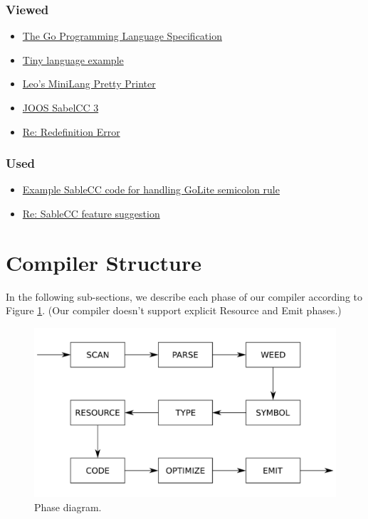 \documentclass{article}
\begin{document}
\subsubsection{Viewed}
\begin{itemize}
\item \href{https://golang.org/ref/spec}{The Go Programming Language Specification}
\item \href{http://www.sable.mcgill.ca/~hendren/520/2016/tiny/}{Tiny language example}
\item \href{https://github.com/leo-teng-long/minipart2/blob/master/src/mini/PrettyPrinter.java}{Leo's MiniLang Pretty Printer}
\item \href{http://www.sable.mcgill.ca/~hendren/520/2016/joos/jjoos-scc-3/}{JOOS SabelCC 3}
\item \href{http://www.sable.mcgill.ca/listarchives/sablecc-list/msg00639.html}{Re: Redefinition Error}
\end{itemize}

\subsubsection{Used}
\begin{itemize}
\item \href{http://www.sable.mcgill.ca/~hendren/520/2016/semicolon-test/}{Example SableCC code for handling GoLite semicolon rule}
\item \href{http://lists.sablecc.org/pipermail/sablecc-discussion/msg00144.html}{Re: SableCC feature suggestion}
\end{itemize}
\section{Compiler Structure}

In the following sub-sections, we describe each phase of our compiler according to Figure \ref{fig:phase}. (Our compiler doesn't support explicit Resource and Emit phases.)

\begin{figure}[h]
  \centering
  \includegraphics[width=\linewidth]{phase.pdf}
  \caption{Phase diagram.}
  \label{fig:phase}
\end{figure}
\end{document}
